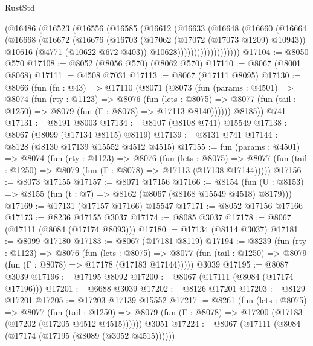\begin{lexlean}{RustStd}
\begin{coremodule}
                (@16486
                  (@16523
                    (@16556
                      (@16585
                        (@16612
                          (@16633
                            (@16648
                              (@16660
                                (@16664
                                  (@16668
                                    (@16672
                                      (@16676
                                        (@16703
                                          (@17062 (@17072 (@17073 @1209) @10943))
                                          @10616
                                          (@4771 (@10622 @672 @403))
                                          @10628)))))))))))))))))))
@17104 := @8050 @570
@17108 := @8052 (@8056 @570) (@8062 @570)
@17110 := @8067 (@8001 @8068)
@17111 := @4508 @7031
@17113 := @8067 (@17111 @8095)
@17130 := @8066
    (fun (fn : @43) =>
    @17110
      (@8071
        (@8073
          (fun (params : @4501) =>
          @8074
            (fun (rty : @1123) =>
            @8076
              (fun (lets : @8075) =>
              @8077 (fun (tail : @1250) => @8079 (fun (Γ : @8078) => @17113 @8140))))))
        @8185))
    @741
@17131 := @8191 @8003
@17134 := @8107 (@8108 @741) @15549
@17138 := @8067 (@8099 (@17134 @8115) @8119)
@17139 := @8131 @741
@17144 := @8128 (@8130 @17139 @15552 @4512 @4515)
@17155 := fun (params : @4501) =>
  @8074
    (fun (rty : @1123) =>
    @8076
      (fun (lets : @8075) =>
      @8077 (fun (tail : @1250) => @8079 (fun (Γ : @8078) => @17113 (@17138 @17144)))))
@17156 := @8073 @17155
@17157 := @8071 @17156
@17166 := @8154
    (fun (U : @8153) => @8155 (fun (t : @7) => @8162 (@8067 (@8168 @15549 @4518) @8179)))
@17169 := @17131 (@17157 @17166) @15547
@17171 := @8052 @17156 @17166
@17173 := @8236 @17155 @3037
@17174 := @8085 @3037
@17178 := @8067 (@17111 (@8084 (@17174 @8093)))
@17180 := @17134 (@8114 @3037)
@17181 := @8099 @17180
@17183 := @8067 (@17181 @8119)
@17194 := @8239
    (fun (rty : @1123) =>
    @8076
      (fun (lets : @8075) =>
      @8077 (fun (tail : @1250) => @8079 (fun (Γ : @8078) => @17178 (@17183 @17144)))))
    @3039
@17195 := @8087 @3039
@17196 := @17195 @8092
@17200 := @8067 (@17111 (@8084 (@17174 @17196)))
@17201 := @6688 @3039
@17202 := @8126 @17201
@17203 := @8129 @17201
@17205 := @17203 @17139 @15552
@17217 := @8261
    (fun (lets : @8075) =>
    @8077
      (fun (tail : @1250) =>
      @8079 (fun (Γ : @8078) => @17200 (@17183 (@17202 (@17205 @4512 @4515))))))
    @3051
@17224 := @8067 (@17111 (@8084 (@17174 (@17195 (@8089 (@3052 @4515))))))

\end{coremodule}
\end{lexlean}
